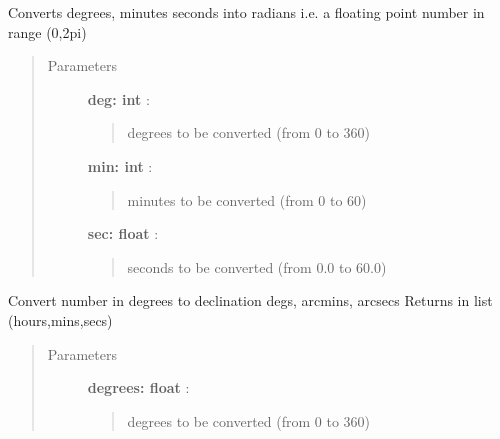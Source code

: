 \documentclass[letterpaper,10pt,english]{sphinxmanual}
\begin{document}
\begin{fulllineitems}
\label{index:astroCoords.decdms2rad}
Converts degrees, minutes seconds into radians 
i.e. a floating point number in range (0,2pi)
\begin{quote}\begin{description}
\item[{Parameters }] \leavevmode
\textbf{deg: int} :
\begin{quote}

degrees to be converted (from 0 to 360)
\end{quote}

\textbf{min: int} :
\begin{quote}

minutes to be converted (from 0 to 60)
\end{quote}

\textbf{sec: float} :
\begin{quote}

seconds to be converted (from 0.0 to 60.0)
\end{quote}

\end{description}\end{quote}

\end{fulllineitems}



\begin{fulllineitems}
\label{index:astroCoords.deg2decdms}
Convert number in degrees to declination degs, arcmins, arcsecs
Returns in list (hours,mins,secs)
\begin{quote}\begin{description}
\item[{Parameters }] \leavevmode
\textbf{degrees: float} :
\begin{quote}

degrees to be converted (from 0 to 360)
\end{quote}

\end{description}\end{quote}

\end{fulllineitems}


\end{document}
